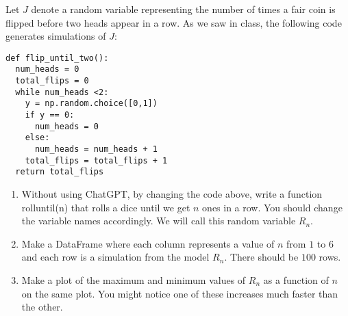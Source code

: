 \begin{exercise}
Let $J$ denote a random variable representing the number of times a fair coin is flipped before two heads appear in a row. As we saw in class, the following code generates simulations of $J$:
\begin{Verbatim}
def flip_until_two():
  num_heads = 0
  total_flips = 0
  while num_heads <2:
    y = np.random.choice([0,1])
    if y == 0:
      num_heads = 0
    else:
      num_heads = num_heads + 1
    total_flips = total_flips + 1
  return total_flips
\end{Verbatim}

\begin{enumerate}[label=(\alph*)]
\item  Without using ChatGPT, by changing the code above, write a function rolluntil(n) that rolls a dice until we
get $n$ ones in a row. You should change the variable names accordingly. We will call this random variable $R_n$.
\item  Make a DataFrame where each column represents a value of $n$ from $1$ to $6$ and each row is a simulation from the model $R_n$. There should be $100$ rows.
\item Make a plot of the maximum and minimum values of $R_n$ as a function of $n$ on the same plot. You might notice one of these increases much faster than the other.  
\end{enumerate}
\end{exercise}



